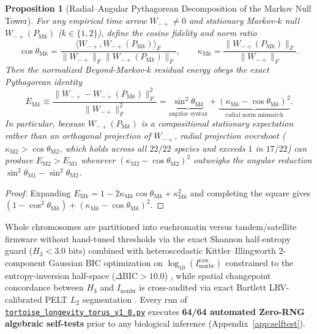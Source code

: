 \documentclass[11pt,a4paper]{article}
\renewcommand{\_}{\origunderscore\penalty200\relax}
\newtheorem{proposition}[theorem]{Proposition}
\theoremstyle{remark}
\begin{document}
\begin{proposition}[Radial--Angular Pythagorean Decomposition of the Markov Null Tower]
\label{prop:radial_angular}
For any empirical time arrow $W_{-+} \ne 0$ and stationary Markov-$k$ null $W_{-+}(P_{\mathrm{M}k})$ ($k \in \{1,2\}$), define the cosine fidelity and norm ratio
\[
\cos\theta_{\mathrm{M}k} = \frac{\langle W_{-+}, W_{-+}(P_{\mathrm{M}k})\rangle_F}{\|W_{-+}\|_F \|W_{-+}(P_{\mathrm{M}k})\|_F}, \qquad \kappa_{\mathrm{M}k} = \frac{\|W_{-+}(P_{\mathrm{M}k})\|_F}{\|W_{-+}\|_F}.
\]
Then the normalized Beyond-Markov-$k$ residual energy obeys the exact Pythagorean identity
\begin{equation}
E_{\mathrm{M}k} \equiv \frac{\|W_{-+} - W_{-+}(P_{\mathrm{M}k})\|_F^2}{\|W_{-+}\|_F^2} = \underbrace{\sin^2\theta_{\mathrm{M}k}}_{\text{angular syntax}} + \underbrace{(\kappa_{\mathrm{M}k} - \cos\theta_{\mathrm{M}k})^2}_{\text{radial norm mismatch}}.
\end{equation}
In particular, because $W_{-+}(P_{\mathrm{M}k})$ is a compositional stationary expectation rather than an orthogonal projection of $W_{-+}$, radial projection overshoot ($\kappa_{\mathrm{M2}} > \cos\theta_{\mathrm{M2}}$, which holds across all $22/22$ species and exceeds $1$ in $17/22$) can produce $E_{\mathrm{M2}} > E_{\mathrm{M1}}$ whenever $(\kappa_{\mathrm{M2}} - \cos\theta_{\mathrm{M2}})^2$ outweighs the angular reduction $\sin^2\theta_{\mathrm{M1}} - \sin^2\theta_{\mathrm{M2}}$.
\end{proposition}
\begin{proof}
Expanding $E_{\mathrm{M}k} = 1 - 2\kappa_{\mathrm{M}k}\cos\theta_{\mathrm{M}k} + \kappa_{\mathrm{M}k}^2$ and completing the square gives $(1 - \cos^2\theta_{\mathrm{M}k}) + (\kappa_{\mathrm{M}k} - \cos\theta_{\mathrm{M}k})^2$.
\end{proof}

Whole chromosomes are partitioned into euchromatin versus tandem/satellite firmware without hand-tuned thresholds via the exact Shannon half-entropy guard ($H_3 < 3.0\text{ bits}$) combined with heteroscedastic Kittler--Illingworth 2-component Gaussian BIC optimization on $\log_{10}(I_{\mathrm{nonbr}}^{\mathrm{raw}})$ constrained to the entropy-inversion half-space ($\Delta\mathrm{BIC} > 10.0$) \cite{Kittler1986}, while spatial changepoint concordance between $H_3$ and $I_{\mathrm{nonbr}}$ is cross-audited via exact Bartlett LRV-calibrated PELT $L_2$ segmentation \cite{Killick2012}.
Every run of \href{https://github.com/Dr-Logvinovich/longevity-codon-torus/blob/main/tortoise_longevity_torus_v1_0.py}{\nolinkurl{tortoise_longevity_torus_v1_0.py}} executes \textbf{64/64 automated Zero-RNG algebraic self-tests} prior to any biological inference (Appendix~\ref{app:selftest}).
\end{document}
